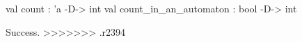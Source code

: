 \chklistingfalse
{}
\begin{ChkListingMsg}
val count : 'a -D-> int 
val count_in_an_automaton : bool -D-> int 
\end{ChkListingMsg}
\begin{ChkListingErr}
Success.
>>>>>>> .r2394
\end{ChkListingErr}
